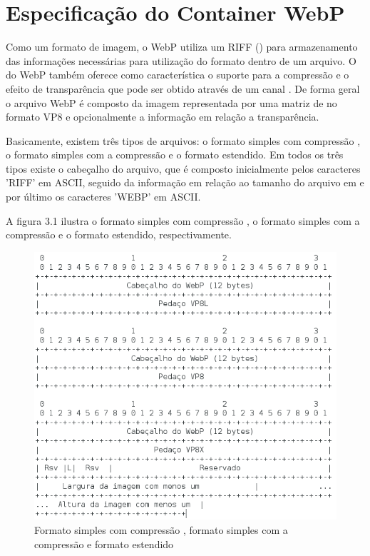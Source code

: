 \documentclass[espaco=simples,appendix=Name]{abnt}
\begin{document}
\section{Especificação do Container WebP}

Como um formato de imagem, o WebP utiliza um  RIFF () para armazenamento das informações necessárias para utilização do formato dentro de um arquivo. O  do WebP também oferece como característica o suporte para a compressão  e o efeito de transparência que pode ser obtido através de um canal . De forma geral o arquivo WebP é composto da imagem representada por uma matriz de  no formato VP8 e opcionalmente a informação em relação a transparência.

Basicamente, existem três tipos de arquivos: o formato simples com compressão , o formato simples com a compressão  e o formato estendido. Em todos os três tipos existe o cabeçalho do arquivo, que é composto inicialmente pelos caracteres 'RIFF' em ASCII, seguido da informação em relação ao tamanho do arquivo em  e por último os caracteres 'WEBP' em ASCII.

\newpage

A figura 3.1 ilustra o formato simples com compressão , o formato simples com a compressão  e o formato estendido, respectivamente.

\begin{figure}[h]
  \centering
    \includegraphics[scale=0.5]{LossyLossLessExtended.png}
  \caption{Formato simples com compressão , formato simples com a compressão  e formato estendido}
\end{figure}
\end{document}
